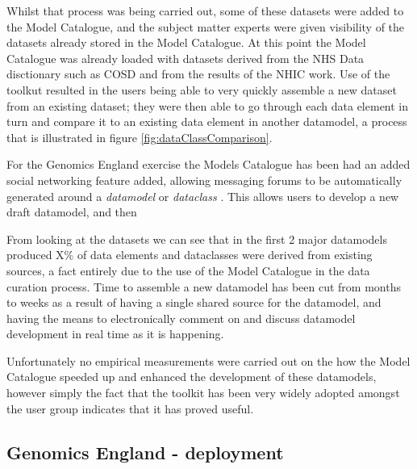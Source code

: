 Whilst that process was being carried out, some of these datasets were added to the Model Catalogue, and the subject matter experts were given visibility of the datasets already stored in the Model Catalogue. At this point the Model Catalogue was already loaded with datasets derived from the NHS Data disctionary such as COSD and from the results of the NHIC work. Use of the toolkut resulted in the users being able to very quickly assemble a new dataset from an existing dataset; they were then able to go through each data element in turn and compare it to an existing data element in another datamodel, a process that is illustrated in figure \ref{fig:dataClassComparison}.

For the Genomics England exercise the Models Catalogue has been had an added social networking feature added, allowing messaging forums to be automatically generated around a \emph{datamodel} or \emph{dataclass} . This allows users to develop a new draft datamodel, and then 

From looking at the datasets we can see that in the first 2 major datamodels produced X\% of data elements and dataclasses were derived from existing sources, a fact entirely due to the use of the Model Catalogue in the data curation process. Time to assemble a new datamodel has been cut from months to weeks as a result of having a single shared source for the datamodel, and having the means to electronically comment on and discuss datamodel development in real time as it is happening.


Unfortunately no empirical measurements were carried out on the how the Model Catalogue speeded up and enhanced the development of these datamodels, however simply the fact that the toolkit has been very widely adopted amongst the user group indicates that it has proved useful.


\subsection{Genomics England -  deployment}
